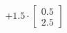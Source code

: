 \documentclass[preview]{standalone}
\begin{document}
\begin{align*}
+ 1.5 \cdot \begin{bmatrix} 0.5 \\ 2.5 \end{bmatrix}
\end{align*}
\end{document}
